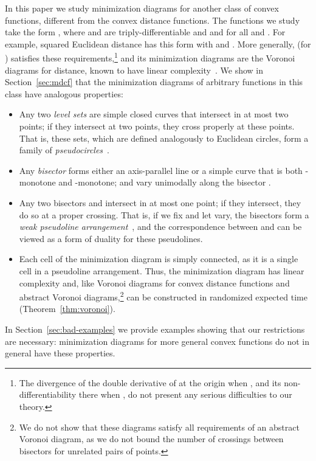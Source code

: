 \documentclass[10pt, conference, compsocconf]{IEEEtran}
\begin{document}
In this paper we study minimization diagrams for another class of convex functions, different from the convex distance functions. The functions we study take the form , where  and  are triply-differentiable and  and  for all  and . For example, squared Euclidean distance has this form with  and . More generally,  (for ) satisfies these requirements,\footnote{The divergence of the double derivative of  at the origin when , and its non-differentiability there when , do not present any serious difficulties to our theory.} and its minimization diagrams are the Voronoi diagrams for  distance, known to have linear complexity~\cite{CheDry-SoCG-85}. We show in Section~\ref{sec:mdcf} that the minimization diagrams of arbitrary functions in this class have analogous properties:
\begin{itemize}
\item Any two \emph{level sets}  are simple closed curves that intersect in at most two points; if they intersect at two points, they cross properly at these points. That is, these sets, which are defined analogously to Euclidean circles, form a family of \emph{pseudocircles}~\cite{KedLivPac-DCG-86,LinOrt-BAG-05}.
\item Any \emph{bisector}  forms either an axis-parallel line or a simple curve that is both -monotone and -monotone;  and  vary unimodally along the bisector .
\item Any two bisectors  and  intersect in at most one point; if they intersect, they do so at a proper crossing. That is, if we fix  and let  vary, the bisectors  form a \emph{weak pseudoline arrangement}~\cite{Epp-GD-04,EppFalOvc-07,FraOss-GD-03}, and the correspondence between  and  can be viewed as a form of duality for these pseudolines.
\item Each cell of the minimization diagram is simply connected, as it is a single cell in a pseudoline arrangement. Thus, the minimization diagram has linear complexity and, like Voronoi diagrams for convex distance functions and abstract Voronoi diagrams,\footnote{We do not show that these diagrams satisfy all requirements of an abstract Voronoi diagram, as we do not bound the number of crossings between bisectors for unrelated pairs of points.} can be constructed in randomized expected time  (Theorem~\ref{thm:voronoi}).
\end{itemize}
In Section~\ref{sec:bad-examples} we provide examples showing that our restrictions are necessary: minimization diagrams for more general convex functions do not in general have these properties.
\end{document}
